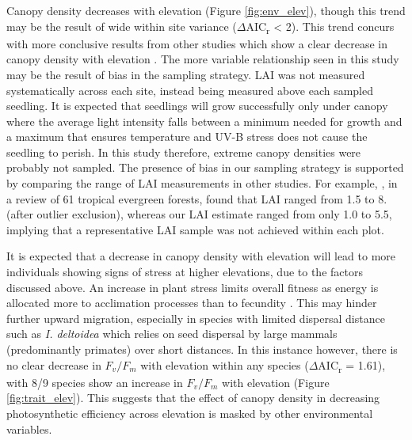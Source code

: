 \documentclass[a4paper,11pt]{article}
\begin{document}
Canopy density decreases with elevation (Figure \ref{fig:env_elev}), though this trend may be the result of wide within site variance ($\Delta$AIC\textsubscript{r} < 2). This trend concurs with more conclusive results from other studies which show a clear decrease in canopy density with elevation \citep{Kitayama2002, Moser2008}. The more variable relationship seen in this study may be the result of bias in the sampling strategy. LAI was not measured systematically across each site, instead being measured above each sampled seedling. It is expected that seedlings will grow successfully only under canopy where the average light intensity falls between a minimum needed for growth and a maximum that ensures temperature and UV-B stress does not cause the seedling to perish. In this study therefore, extreme canopy densities were probably not sampled. The presence of bias in our sampling strategy is supported by comparing the range of LAI measurements in other studies. For example, \citet{Asner2003}, in a review of 61 tropical evergreen forests, found that LAI ranged from 1.5 to 8. (after outlier exclusion), whereas our LAI estimate ranged from only 1.0 to 5.5, implying that a representative LAI sample was not achieved within each plot.

It is expected that a decrease in canopy density with elevation will lead to more individuals showing signs of stress at higher elevations, due to the factors discussed above. An increase in plant stress limits overall fitness as energy is allocated more to acclimation processes than to fecundity \citep{Reu2011}. This may hinder further upward migration, especially in species with limited dispersal distance such as \textit{I. deltoidea} which relies on seed dispersal by large mammals (predominantly primates) \citep{Russo2005, Kuprewicz2013} over short distances. In this instance however, there is no clear decrease in $F_v/F_m$ with elevation within any species ($\Delta$AIC\textsubscript{r} = 1.61), with 8/9 species show an increase in $F_v/F_m$ with elevation (Figure \ref{fig:trait_elev}). This suggests that the effect of canopy density in decreasing photosynthetic efficiency across elevation is masked by other environmental variables.

\end{document}
